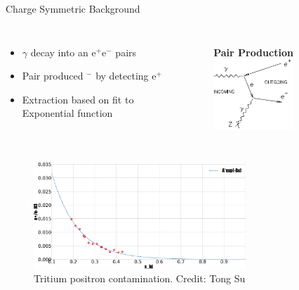\documentclass[12pt]{beamer}
\begin{document}
\begin{frame}{Charge Symmetric Background}
\vspace{-0pt}

\begin{columns}
	\vspace*{-0.75cm}
	\begin{itemize}
		\item $\gamma$ decay into an e$^+$e$^-$ pairs
		\item  Pair produced $^-$ by detecting e$^+$
		\item Extraction based on fit to Exponential function 
	\end{itemize}
	\vspace{-40pt}
	\begin{figure}
		\textbf{Pair Production}
		\includegraphics[width=3.0cm]{../images/pp_FD.png}
	\end{figure}
\end{columns}


\begin{figure}
	\caption*{Tritium positron contamination. Credit: Tong Su}
	\includegraphics[width=8.0cm]{../images/positron_H3_bane.pdf}
\end{figure}




\end{frame}
\end{document}

